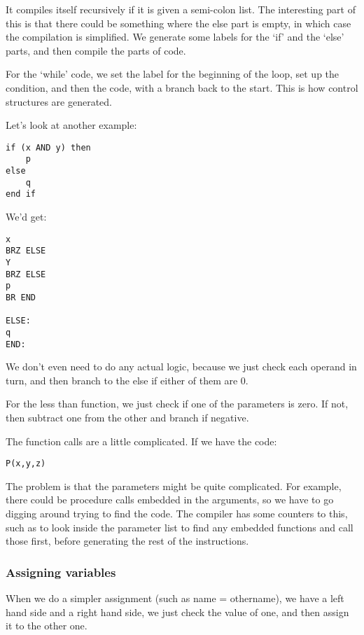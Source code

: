 \documentclass[11pt,a4paper,titlepage,dvipsnames,cmyk]{scrartcl}
\begin{document}
It compiles itself recursively if it is given a semi-colon list. The
interesting part of this is that there could be something where the else
part is empty, in which case the compilation is simplified. We generate
some labels for the `if' and the `else' parts, and then compile the parts
of code.

For the `while' code, we set the label for the beginning of the loop, set
up the condition, and then the code, with a branch back to the start. This
is how control structures are generated.

Let's look at another example:

\begin{lstlisting}[]
if (x AND y) then
    p
else
    q
end if
\end{lstlisting}

We'd get:
\begin{lstlisting}[]
x
BRZ ELSE
Y
BRZ ELSE
p
BR END

ELSE:
q
END:
\end{lstlisting}

We don't even need to do any actual logic, because we just check each
operand in turn, and then branch to the else if either of them are 0.

For the less than function, we just check if one of the parameters is
zero. If not, then subtract one from the other and branch if negative.

The function calls are a little complicated. If we have the code:

\begin{lstlisting}[]
P(x,y,z)
\end{lstlisting}

The problem is that the parameters might be quite complicated. For
example, there could be procedure calls embedded in the arguments, so we
have to go digging around trying to find the code. The compiler has some
counters to this, such as to look inside the parameter list to find any
embedded functions and call those first, before generating the rest of the
instructions.

\subsubsection{Assigning variables}%
\label{ssub:Assigning variables}

When we do a simpler assignment (such as name = othername), we have a left
hand side and a right hand side, we just check the value of one, and then
assign it to the other one.
\end{document}
